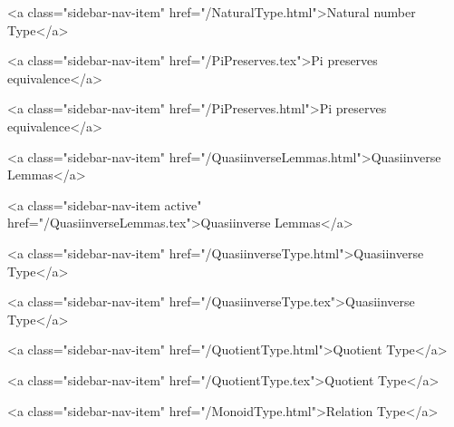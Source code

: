       
    
      
        
      
    
      
        
          <a class="sidebar-nav-item" href="/NaturalType.html">Natural number Type</a>
        
      
    
      
        
          <a class="sidebar-nav-item" href="/PiPreserves.tex">Pi preserves equivalence</a>
        
      
    
      
        
          <a class="sidebar-nav-item" href="/PiPreserves.html">Pi preserves equivalence</a>
        
      
    
      
        
          <a class="sidebar-nav-item" href="/QuasiinverseLemmas.html">Quasiinverse Lemmas</a>
        
      
    
      
        
          <a class="sidebar-nav-item active" href="/QuasiinverseLemmas.tex">Quasiinverse Lemmas</a>
        
      
    
      
        
          <a class="sidebar-nav-item" href="/QuasiinverseType.html">Quasiinverse Type</a>
        
      
    
      
        
          <a class="sidebar-nav-item" href="/QuasiinverseType.tex">Quasiinverse Type</a>
        
      
    
      
        
          <a class="sidebar-nav-item" href="/QuotientType.html">Quotient Type</a>
        
      
    
      
        
          <a class="sidebar-nav-item" href="/QuotientType.tex">Quotient Type</a>
        
      
    
      
        
          <a class="sidebar-nav-item" href="/MonoidType.html">Relation Type</a>
        
      
    
